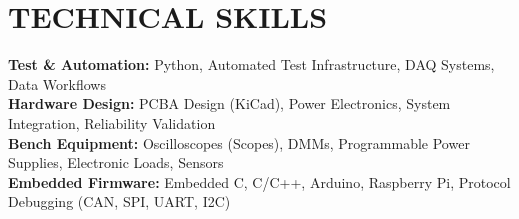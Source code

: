 \documentclass[letterpaper,11pt]{article}
\begin{document}
\section{TECHNICAL SKILLS}
 \begin{itemize}[leftmargin=0.15in, label={}]
    \small{\item{
     \textbf{Test \& Automation:} Python, Automated Test Infrastructure, DAQ Systems, Data Workflows \\
     \textbf{Hardware Design:} PCBA Design (KiCad), Power Electronics, System Integration, Reliability Validation \\
     \textbf{Bench Equipment:} Oscilloscopes (Scopes), DMMs, Programmable Power Supplies, Electronic Loads, Sensors \\
     \textbf{Embedded Firmware:} Embedded C, C/C++, Arduino, Raspberry Pi, Protocol Debugging (CAN, SPI, UART, I2C)
    }}
 \end{itemize}


\end{document}
